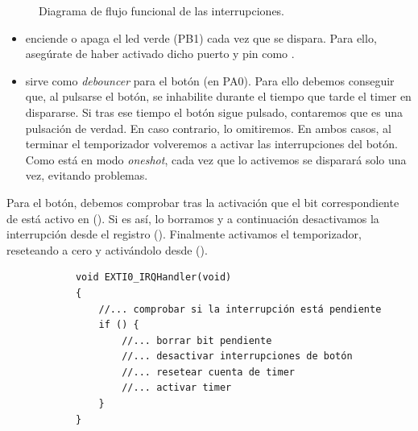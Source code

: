 \documentclass[../main.tex]{subfiles}
\begin{document}
\begin{figure}[htbp]
        \caption{Diagrama de flujo funcional de las interrupciones.}
        \label{fig:debounce_tim_flow}
        \end{figure}

        \begin{itemize}
            \item {} enciende o apaga el led verde (PB1) cada vez que se dispara. Para ello, asegúrate de haber activado dicho puerto y pin como .
            \item {} sirve como \emph{debouncer} para el botón (en PA0). Para ello debemos conseguir que, al pulsarse el botón, se inhabilite durante el tiempo que tarde el timer en dispararse. Si tras ese tiempo el botón sigue pulsado, contaremos que es una pulsación de verdad. En caso contrario, lo omitiremos. En ambos casos, al terminar el temporizador volveremos a activar las interrupciones del botón. Como está en modo \emph{oneshot}, cada vez que lo activemos se disparará solo una vez, evitando problemas.
        \end{itemize}
            
        Para el botón, debemos comprobar tras la activación que el bit correspondiente de  está activo en  (\REFMAN[10.9.6]). Si es así, lo borramos y a continuación desactivamos la interrupción desde el registro  (\REFMAN[10.9.1]). Finalmente activamos el temporizador, reseteando  a cero y activándolo desde  (\REFMAN[19.4.1]).
        
        \begin{lstlisting}
            void EXTI0_IRQHandler(void)
            {
                //... comprobar si la interrupción está pendiente
                if () {
                    //... borrar bit pendiente
                    //... desactivar interrupciones de botón
                    //... resetear cuenta de timer
                    //... activar timer
                }
            }
        \end{lstlisting}
\end{document}

